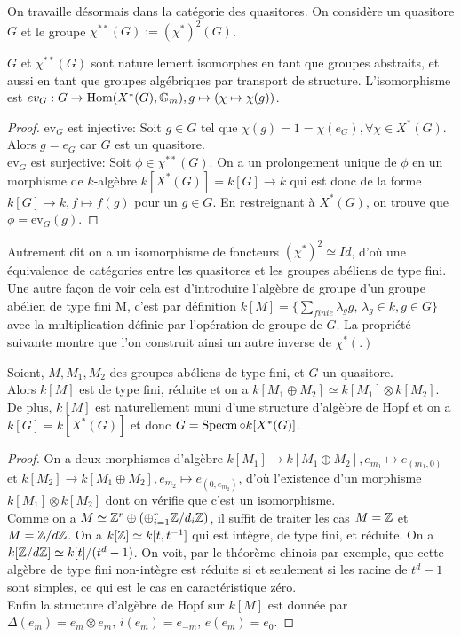 On travaille désormais dans la catégorie des quasitores. On considère un quasitore $G$ et le groupe $\chi^{**}(G):=(\chi^*)^2(G)$.

\begin{prop}
$G$ et $\chi^{**}(G)$ sont naturellement isomorphes en tant que groupes abstraits, et aussi en tant que groupes algébriques par transport de structure. L'isomorphisme est $ev_G : G\rightarrow \operatorname{Hom} (X^*(G),\mathbb{G} _m), g\mapsto (\chi\mapsto \chi(g))$.
\end{prop}
\begin{proof}
ev$_G$ est injective: Soit $g\in G$ tel que $\chi(g)=1=\chi(e_G),\forall \chi\in X^*(G)$. Alors $g=e_G$ car $G$ est un quasitore.\\
ev$_G$ est surjective: Soit $\phi\in\chi^{**}(G)$. On a un prolongement unique de $\phi$ en un morphisme de $k$-algèbre $k[X^*(G)]=k[G]\rightarrow k$ qui est donc de la forme $k[G]\rightarrow k, f\mapsto f(g)$ pour un $g\in G$. En restreignant à $X^*(G)$, on trouve que $\phi=\textrm{ev}_G(g)$.
\end{proof}

Autrement dit on a un isomorphisme de foncteurs $(\chi^*)^2\simeq Id$, d'où une équivalence de catégories entre les quasitores et les groupes abéliens de type fini. Une autre façon de voir cela est d'introduire l'algèbre de groupe d'un groupe abélien de type fini M, c'est par définition $k[M]=\lbrace \sum_{finie} \lambda_gg,\,\lambda_g\in k,g\in G \rbrace$ avec la multiplication définie par l'opération de groupe de $G$. La propriété suivante montre que l'on construit ainsi un autre inverse de $\chi^*(.)$
\begin{prop}
Soient, $M, M_1, M_2$ des groupes abéliens de type fini, et $G$ un quasitore.\\
Alors $k[M]$ est de type fini, réduite et on a $k[M_1\oplus M_2]\simeq k[M_1]\otimes k[M_2]$. De plus, $k[M]$ est naturellement muni d'une structure d'algèbre de Hopf et on a $k[G]=k[X^*(G)]$ et donc $G=\operatorname{Specm}\circ k[X^*(G)]$.
\end{prop}
\begin{proof}
On a deux morphismes d'algèbre $k[M_1]\rightarrow k[M_1\oplus M_2], e_{m_1}\mapsto e_{(m_1,0)}$ et $k[M_2]\rightarrow k[M_1\oplus M_2], e_{m_2}\mapsto e_{(0,e_{m_2})}$, d'où l'existence d'un morphisme $k[M_1]\otimes k[M_2]$ dont on vérifie que c'est un isomorphisme.\\
Comme on a $M\simeq \mathbb{Z}^r\oplus (\oplus_{i=1}^r \mathbb{Z}/d_i\mathbb{Z})$, il suffit de traiter les cas $M=\mathbb{Z}$ et $M=\mathbb{Z}/d\mathbb{Z}$. On a $k[\mathbb{Z}]\simeq k[t,t^{-1}]$ qui est intègre, de type fini, et réduite. On a $k[\mathbb{Z}/d\mathbb{Z}]\simeq k[t]/(t^d-1)$. On voit, par le théorème chinois par exemple, que cette algèbre de type fini non-intègre est réduite si et seulement si les racine de $t^d-1$ sont simples, ce qui est le cas en caractéristique zéro.\\
Enfin la structure d'algèbre de Hopf sur $k[M]$ est donnée par $\Delta(e_m)=e_m\otimes e_m,\, i(e_m)=e_{-m},\, e(e_m)=e_0$.
\end{proof}

